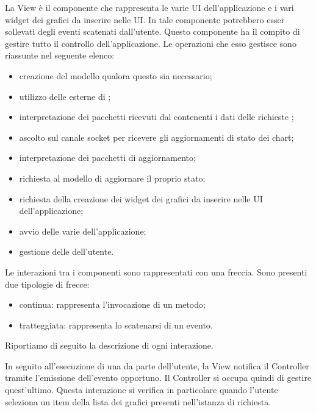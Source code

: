         La View è il componente che rappresenta le varie UI dell'applicazione e i vari widget dei grafici da inserire nelle UI. In tale componente potrebbero esser sollevati degli eventi scatenati dall'utente.
        Questo componente ha il compito di gestire tutto il controllo dell'applicazione. Le operazioni che esso gestisce sono riassunte nel seguente elenco:
        	\begin{itemize}
        		\item creazione del modello qualora questo sia necessario;
        		\item utilizzo delle  esterne di ;
        		\item interpretazione dei pacchetti ricevuti dal  contenenti i dati delle richieste ;
        		\item ascolto sul canale socket per ricevere gli aggiornamenti di stato dei chart;
        		\item interpretazione dei pacchetti di aggiornamento;
        		\item richiesta al modello di aggiornare il proprio stato;
        		\item richiesta della creazione dei widget dei grafici da inserire nelle UI dell'applicazione;
        		\item avvio delle varie  dell'applicazione;
        		\item gestione delle  dell'utente.
        \end{itemize}
    	Le interazioni tra i componenti sono rappresentati con una freccia. Sono presenti due tipologie di frecce:
    	\begin{itemize}
    			\item{continua: } rappresenta l'invocazione di un metodo;
    			\item{tratteggiata: } rappresenta lo scatenarsi di un evento.
    		\end{itemize}

    	Riportiamo di seguito la descrizione di ogni interazione.

        In seguito all'esecuzione di una  da parte dell'utente, la View notifica il Controller tramite l'emissione dell'evento opportuno. Il Controller si occupa quindi di gestire quest'ultimo. Questa interazione si verifica in particolare quando l'utente seleziona un item della lista dei grafici presenti nell'istanza di  richiesta.

